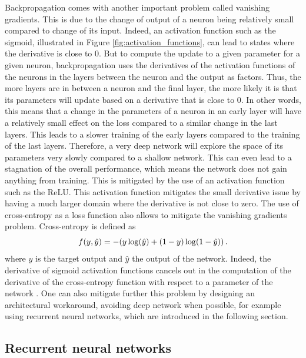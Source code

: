 Backpropagation comes with another important problem called vanishing gradients. This is due to the change of output of a neuron being relatively small compared to change of its input. Indeed, an activation function such as the sigmoid, illustrated in Figure \ref{fig:activation_functions}, can lead to states where the derivative is close to 0. But to compute the update to a given parameter for a given neuron, backpropagation uses the derivatives of the activation functions of the neurons in the layers between the neuron and the output as factors. Thus, the more layers are in between a neuron and the final layer, the more likely it is that its parameters will update based on a derivative that is close to 0. In other words, this means that a change in the parameters of a neuron in an early layer will have a relatively small effect on the loss compared to a similar change in the last layers. This leads to a slower training of the early layers compared to the training of the last layers. Therefore, a very deep network will explore the space of its parameters very slowly compared to a shallow network. This can even lead to a stagnation of the overall performance, which means the network does not gain anything from training. This is mitigated by the use of an activation function such as the ReLU. This activation function mitigates the small derivative issue by having a much larger domain where the derivative is not close to zero. The use of cross-entropy as a loss function also allows to mitigate the vanishing gradients problem. Cross-entropy is defined as 
\begin{equation}
    f(y,\hat{y}) = -(y\,\mathrm{log}(\hat{y}) + (1-y)\,\mathrm{log}(1-\hat{y})) \mend
\end{equation}
where $y$ is the target output and $\hat{y}$ the output of the network. Indeed, the derivative of sigmoid activation functions cancels out in the computation of the derivative of the cross-entropy function with respect to a parameter of the network \cite{NN_book}. One can also mitigate further this problem by designing an architectural workaround, avoiding deep network when possible, for example using recurrent neural networks, which are introduced in the following section.

\subsection{Recurrent neural networks}

